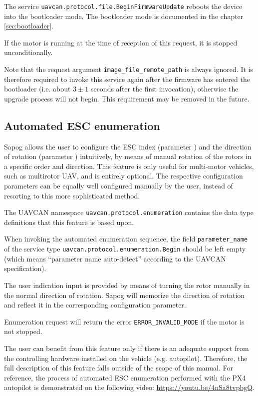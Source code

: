 \documentclass{zubaxdoc}
\begin{document}
The service \verb|uavcan.protocol.file.BeginFirmwareUpdate| reboots the device into the bootloader
mode.
The bootloader mode is documented in the chapter \ref{sec:bootloader}.

If the motor is running at the time of reception of this request, it is stopped unconditionally.

Note that the request argument \verb|image_file_remote_path| is always ignored.
It is therefore required to invoke this service again after the firmware has entered the bootloader
(i.e. about $3\pm{}1$ seconds after the first invocation),
otherwise the upgrade process will not begin.
This requirement may be removed in the future.

\subsection{Automated ESC enumeration}

Sapog allows the user to configure the ESC index (parameter )
and the direction of rotation (parameter ) intuitively,
by means of manual rotation of the rotors in a specific order and direction.
This feature is only useful for multi-motor vehicles, such as multirotor UAV,
and is entirely optional.
The respective configuration parameters can be equally well configured manually
by the user, instead of resorting to this more sophisticated method.

The UAVCAN namespace \verb|uavcan.protocol.enumeration| contains the data type definitions that
this feature is based upon.

When invoking the automated enumeration sequence, the field \verb|parameter_name|
of the service type \verb|uavcan.protocol.enumeration.Begin| should be left empty
(which means ``parameter name auto-detect'' according to the UAVCAN specification).

The user indication input is provided by means of turning the rotor manually in the normal
direction of rotation.
Sapog will memorize the direction of rotation and reflect it in the corresponding configuration
parameter.

Enumeration request will return the error \verb|ERROR_INVALID_MODE| if the motor is not stopped.

The user can benefit from this feature only if there is an adequate support from the
controlling hardware installed on the vehicle (e.g. autopilot).
Therefore, the full description of this feature falls outside of the scope of this
manual.
For reference, the process of automated ESC enumeration performed with the PX4 autopilot
is demonstrated on the following video: \url{https://youtu.be/4nSa8tvpbgQ}.
\end{document}
